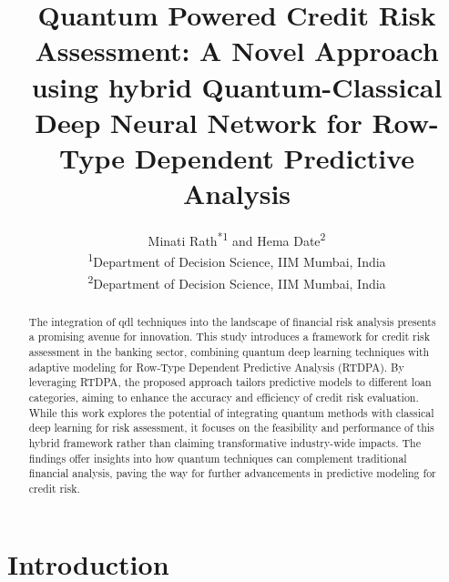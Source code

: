 \documentclass[a4paper]{article}
\title{Quantum Powered Credit Risk Assessment: A Novel Approach using hybrid Quantum-Classical Deep Neural Network for Row-Type Dependent Predictive Analysis}
\begin{document}
	
	
	\maketitle
	
\author{\begin{center}
		Minati Rath\textsuperscript{*1} and Hema Date\textsuperscript{2}\\
		\textsuperscript{1}Department of Decision Science, IIM Mumbai, India\\
		\textsuperscript{2}Department of Decision Science, IIM Mumbai, India
\end{center}}

\begin{abstract}
\noindent The integration of \gls{qdl} techniques into the landscape of financial risk analysis presents a promising avenue for innovation. This study introduces a framework for credit risk assessment in the banking sector, combining quantum deep learning techniques with adaptive modeling for Row-Type Dependent Predictive Analysis (RTDPA). By leveraging RTDPA, the proposed approach tailors predictive models to different loan categories, aiming to enhance the accuracy and efficiency of credit risk evaluation. While this work explores the potential of integrating quantum methods with classical deep learning for risk assessment, it focuses on the feasibility and performance of this hybrid framework rather than claiming transformative industry-wide impacts. The findings offer insights into how quantum techniques can complement traditional financial analysis, paving the way for further advancements in predictive modeling for credit risk.
\end{abstract}
\begin{keywords} \end{keywords}
\section{Introduction}
\end{document}
